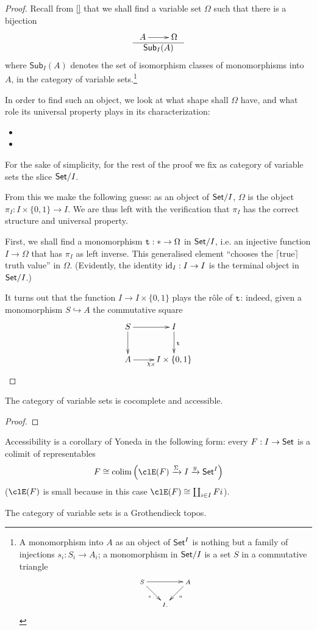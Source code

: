\begin{proof}
	Recall from \ref{} that we shall find a variable set $\Omega$ such that there is a bijection
	\[\begin{array}{c}
			\xymatrix{A \ar[r] & \Omega} \\ \hline
			\textsf{Sub}_I(A)
		\end{array}\]
	where $\textsf{Sub}_I(A)$ denotes the set of isomorphism classes of monomorphisms into $A$, in the category of variable sets.\footnote{A monomorphism into $A$ as an object of $\mathsf{Set}^I$ is nothing but a family of injections $s_i : S_i \to A_i$; a monomorphism in $\mathsf{Set}/I$ is a set $S$ in a commutative triangle
	\[\scriptsize
		\xymatrix@!=1mm{S\ar[rr]\ar[dr]_s && A\ar[dl]^a \\ &I.&}\]}

	In order to find such an object, we look at what shape shall $\Omega$ have, and what role its universal property plays in its characterization:
	\begin{itemize}
		\item
		\item
	\end{itemize}
	For the sake of simplicity, for the rest of the proof we fix as category of variable sets the slice $\mathsf{Set}/I$.

	From this we make the following guess: as an object of $\mathsf{Set}/I$, $\Omega$ is the object $\pi_I : I\times \{0,1\} \to I$. We are thus left with the verification that $\pi_I$ has the correct structure and universal property.

	First, we shall find a monomorphism $\texttt{t} : * \to \Omega$ in $\mathsf{Set}/I$, i.e. an injective function $I\to \Omega$ that has $\pi_I$ as left inverse. This generalised element ``chooses the $\lceil$true$\rceil$ truth value'' in $\Omega$. (Evidently, the identity $\text{id}_I : I \to I$ is the terminal object in $\mathsf{Set}/I$.)

	It turns out that the function $I \to I\times \{0,1\}$ plays the r\^ole of $\texttt{t}$: indeed, given a monomorphism $S \hookrightarrow A$ the commutative square
	\[
		\vcenter{\xymatrix{
				S\ar[d]\ar[r] & I \ar[d]^{\true}\\
				A \ar[r]_{\chi_S} & I\times \{0,1\}
			}}
	\]
\end{proof}
\begin{proposition}
	The category of variable sets is cocomplete and accessible.
\end{proposition}
\begin{proof}

\end{proof}
Accessibility is a corollary of Yoneda in the following form: every $F : I \to \mathsf{Set}$ is a colimit of representables
\[
	F \cong \colim\Big(\clE(F) \xto{\Sigma} I \xto{y} \Set^I\Big)
\]
($\clE(F)$ is small because in this case $\clE(F)\cong\coprod_{i\in I}Fi$).
\begin{corollary}
	The category of variable sets is a Grothendieck topos.
\end{corollary}
